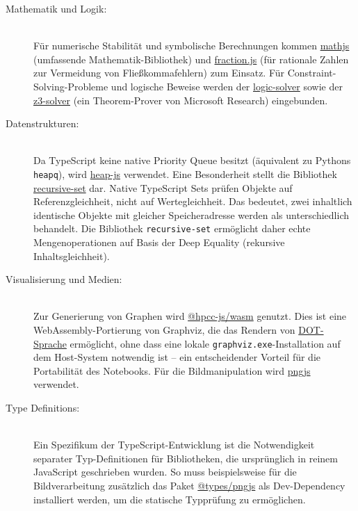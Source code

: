 \begin{description}
	\item[Mathematik und Logik:] \hfill \\
	Für numerische Stabilität und symbolische Berechnungen kommen \href{https://www.npmjs.com/}{mathjs} (umfassende Mathematik-Bibliothek) und \href{https://www.npmjs.com/package/fraction.js}{fraction.js} (für rationale Zahlen zur Vermeidung von Fließkommafehlern) zum Einsatz. Für Constraint-Solving-Probleme und logische Beweise werden der \href{https://www.npmjs.com/package/logic-solver}{logic-solver} sowie der \href{https://www.npmjs.com/package/z3-solver}{z3-solver} (ein Theorem-Prover von Microsoft Research) eingebunden.
	
	\item[Datenstrukturen:] \hfill \\
	Da TypeScript keine native Priority Queue besitzt (äquivalent zu Pythons \texttt{heapq}), wird \href{https://www.npmjs.com/package/heap-js}{heap-js} verwendet. Eine Besonderheit stellt die Bibliothek \href{https://github.com/cstrerath/recursive-set}{recursive-set} dar. Native TypeScript Sets prüfen Objekte auf Referenzgleichheit, nicht auf Wertegleichheit. Das bedeutet, zwei inhaltlich identische Objekte mit gleicher Speicheradresse werden als unterschiedlich behandelt. Die Bibliothek \texttt{recursive-set} ermöglicht daher echte Mengenoperationen auf Basis der Deep Equality (rekursive Inhaltsgleichheit).
	
	\item[Visualisierung und Medien:] \hfill \\
	Zur Generierung von Graphen wird \href{https://www.npmjs.com/package/@hpcc-js/wasm}{@hpcc-js/wasm} genutzt. Dies ist eine WebAssembly-Portierung von Graphviz, die das Rendern von \href{https://de.wikipedia.org/wiki/DOT_(Graphviz)}{DOT-Sprache} ermöglicht, ohne dass eine lokale \texttt{graphviz.exe}-Installation auf dem Host-System notwendig ist – ein entscheidender Vorteil für die Portabilität des Notebooks. Für die Bildmanipulation wird \href{https://www.npmjs.com/package/pngjs}{pngjs} verwendet.
	
	\item[Type Definitions:] \hfill \\
	Ein Spezifikum der TypeScript-Entwicklung ist die Notwendigkeit separater Typ-Definitionen für Bibliotheken, die ursprünglich in reinem JavaScript geschrieben wurden. So muss beispielsweise für die Bildverarbeitung zusätzlich das Paket \href{https://www.npmjs.com/package/@types/pngjs}{@types/pngjs} als Dev-Dependency installiert werden, um die statische Typprüfung zu ermöglichen.
\end{description}



